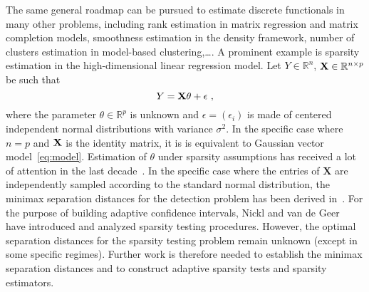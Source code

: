 \documentclass[twoside,11pt]{article}
\def\bX{\mathbf{X}}
\newcommand{\<}{\langle}
\renewcommand{\>}{\rangle}
\begin{document}
The same general roadmap can be pursued to estimate discrete functionals in many other problems, including  rank estimation in matrix regression and matrix completion models, smoothness estimation in the density framework, number of clusters estimation in model-based clustering,\ldots. A prominent example is sparsity estimation in  the high-dimensional linear regression model. Let $Y\in \mathbb{R}^n$, ${\bf X}\in \mathbb{R}^{n\times p}$ be such that 
\[
 Y = {\bf X}\theta + \epsilon\ , 
\]
where the parameter $\theta\in \mathbb{R}^p$ is unknown and $\epsilon=(\epsilon_i)$ is made of centered independent normal distributions with variance $\sigma^2$. In the specific case where $n=p$ and ${\bf X}$ is the identity matrix, it is is equivalent to Gaussian vector	 model~\eqref{eq:model}. Estimation of $\theta$ under sparsity assumptions has received a lot of attention in the last decade~\cite{buhlmann2011statistics}. In the specific case 
where the entries of $\bX$ are independently sampled according to the standard normal distribution, the minimax separation distances for the detection problem has been derived in~\cite{2010_EJS_Ingster,2011_AS_Arias-Castro}. For the purpose of building adaptive confidence intervals,  Nickl and van de Geer~\cite{nickl_vandegeer} have introduced and analyzed sparsity testing procedures. However, the optimal separation distances for the sparsity testing problem remain unknown (except in some specific regimes). Further work is therefore needed to establish the minimax separation distances and to construct adaptive sparsity tests and sparsity estimators. 
\end{document}

